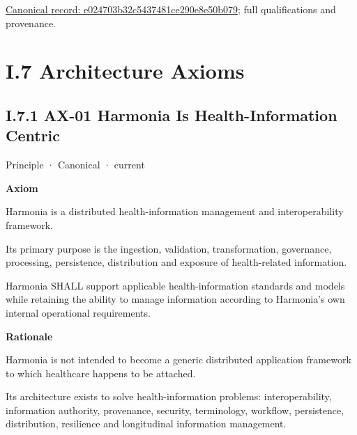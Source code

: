 {\footnotesize \href{../../../../../../../../continuum/motivation/constraint/mandate/e024703b32c5437481ce290e8e50b079.md}{Canonical record: e024703b32c5437481ce290e8e50b079}; full qualifications and provenance.}\par
\chapter*{I.7 Architecture Axioms}
\label{navigation:I.7}

\section*{I.7.1 AX-01 Harmonia Is Health-Information Centric}
\label{navigation:I.7.1}

\label{element:e9bd61acaaea4577bc4086a5639e52c3}
{\small Principle · Canonical · current}\par

\par\medskip\textbf{Axiom}\par


Harmonia is a distributed health-information management and
interoperability framework.



Its primary purpose is the ingestion, validation, transformation,
governance, processing, persistence, distribution and exposure of
health-related information.



Harmonia SHALL support applicable health-information standards and
models while retaining the ability to manage information according to
Harmonia's own internal operational requirements.



\par\medskip\textbf{Rationale}\par


Harmonia is not intended to become a generic distributed application
framework to which healthcare happens to be attached.



Its architecture exists to solve health-information problems:
interoperability, information authority, provenance, security,
terminology, workflow, persistence, distribution, resilience and
longitudinal information management.



